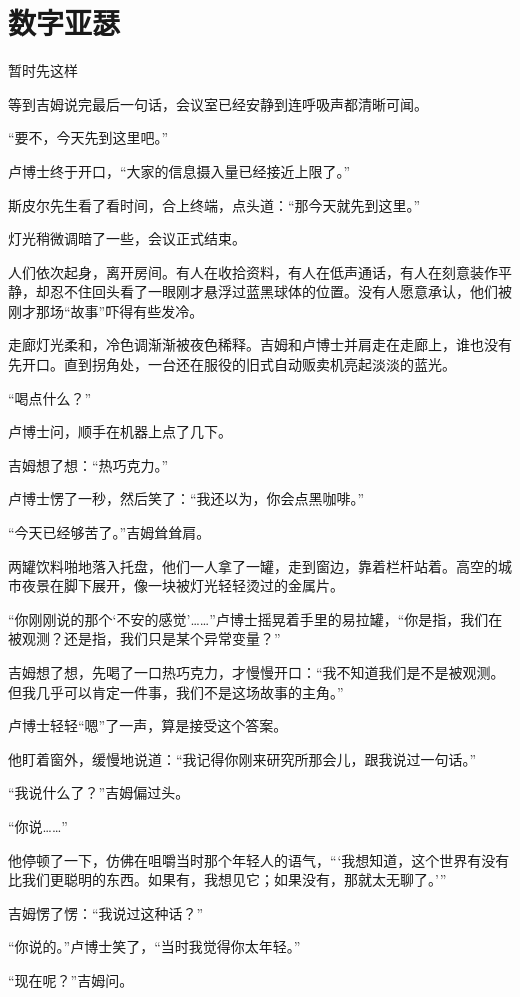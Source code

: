 \chapter{数字亚瑟}

暂时先这样

等到吉姆说完最后一句话，会议室已经安静到连呼吸声都清晰可闻。

“要不，今天先到这里吧。”

卢博士终于开口，“大家的信息摄入量已经接近上限了。”

斯皮尔先生看了看时间，合上终端，点头道：“那今天就先到这里。”

灯光稍微调暗了一些，会议正式结束。

人们依次起身，离开房间。有人在收拾资料，有人在低声通话，有人在刻意装作平静，却忍不住回头看了一眼刚才悬浮过蓝黑球体的位置。没有人愿意承认，他们被刚才那场“故事”吓得有些发冷。

走廊灯光柔和，冷色调渐渐被夜色稀释。吉姆和卢博士并肩走在走廊上，谁也没有先开口。直到拐角处，一台还在服役的旧式自动贩卖机亮起淡淡的蓝光。

“喝点什么？”

卢博士问，顺手在机器上点了几下。

吉姆想了想：“热巧克力。”

卢博士愣了一秒，然后笑了：“我还以为，你会点黑咖啡。”

“今天已经够苦了。”吉姆耸耸肩。

两罐饮料啪地落入托盘，他们一人拿了一罐，走到窗边，靠着栏杆站着。高空的城市夜景在脚下展开，像一块被灯光轻轻烫过的金属片。

“你刚刚说的那个‘不安的感觉’……”卢博士摇晃着手里的易拉罐，“你是指，我们在被观测？还是指，我们只是某个异常变量？”

吉姆想了想，先喝了一口热巧克力，才慢慢开口：“我不知道我们是不是被观测。但我几乎可以肯定一件事，我们不是这场故事的主角。”

卢博士轻轻“嗯”了一声，算是接受这个答案。

他盯着窗外，缓慢地说道：“我记得你刚来研究所那会儿，跟我说过一句话。”

“我说什么了？”吉姆偏过头。

“你说……”

他停顿了一下，仿佛在咀嚼当时那个年轻人的语气，“‘我想知道，这个世界有没有比我们更聪明的东西。如果有，我想见它；如果没有，那就太无聊了。’”

吉姆愣了愣：“我说过这种话？”

“你说的。”卢博士笑了，“当时我觉得你太年轻。”

“现在呢？”吉姆问。

